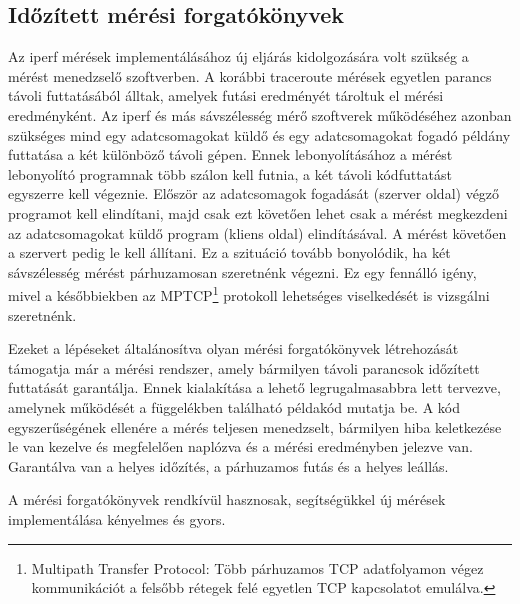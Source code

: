 \subsection{Időzített mérési forgatókönyvek}
Az iperf mérések implementálásához új eljárás kidolgozására volt szükség a mérést menedzselő szoftverben. A korábbi traceroute mérések egyetlen parancs távoli futtatásából álltak, amelyek futási eredményét tároltuk el mérési eredményként. Az iperf és más sávszélesség mérő szoftverek működéséhez azonban szükséges mind egy adatcsomagokat küldő és egy adatcsomagokat fogadó példány futtatása a két különböző távoli gépen. Ennek lebonyolításához a mérést lebonyolító programnak több szálon kell futnia, a két távoli kódfuttatást egyszerre kell végeznie. Először az adatcsomagok fogadását (szerver oldal) végző programot kell elindítani, majd csak ezt követően lehet csak a mérést megkezdeni az adatcsomagokat küldő program (kliens oldal) elindításával. A mérést követően a szervert pedig le kell állítani. Ez a szituáció tovább bonyolódik, ha két sávszélesség mérést párhuzamosan szeretnénk végezni. Ez egy fennálló igény, mivel a későbbiekben az MPTCP\footnote{Multipath Transfer Protocol: Több párhuzamos TCP adatfolyamon végez kommunikációt a felsőbb rétegek felé egyetlen TCP kapcsolatot emulálva.} protokoll lehetséges viselkedését is vizsgálni szeretnénk.

Ezeket a lépéseket általánosítva olyan mérési forgatókönyvek létrehozását támogatja már a mérési rendszer, amely bármilyen távoli parancsok időzített futtatását garantálja. Ennek kialakítása a lehető legrugalmasabbra lett tervezve, amelynek működését a függelékben található példakód mutatja be. A kód egyszerűségének ellenére a mérés teljesen menedzselt, bármilyen hiba keletkezése le van kezelve és megfelelően naplózva és a mérési eredményben jelezve van. Garantálva van a helyes időzítés, a párhuzamos futás és a helyes leállás.

A mérési forgatókönyvek rendkívül hasznosak, segítségükkel új mérések implementálása kényelmes és gyors.